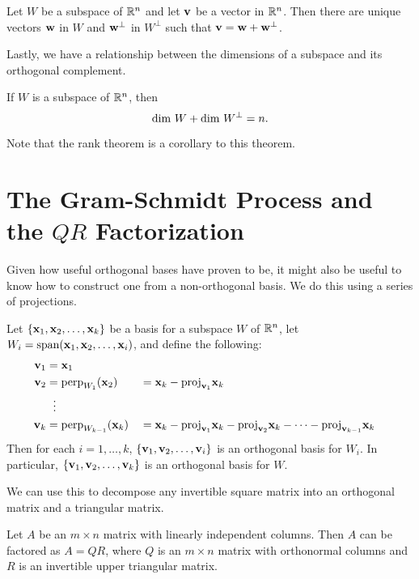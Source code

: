 \documentclass[../m073main.tex]{subfiles}
\begin{document}
\begin{theorem}
	Let $W$ be a subspace of $\mathbb{R}^n$ and let $\mathbf{v}$ be a vector in $\mathbb{R}^n$.
	Then there are unique vectors $\mathbf{w}$ in $W$ and $\mathbf{w}^\perp$ in $W^\perp$ such that $\mathbf{v} = \mathbf{w} + \mathbf{w}^\perp$.
\end{theorem}

\pagebreak

Lastly, we have a relationship between the dimensions of a subspace and its orthogonal complement.

\begin{theorem}
	If $W$ is a subspace of $\mathbb{R}^n$, then
	\[ \textrm{dim } W + \textrm{dim } W^\perp = n. \]
\end{theorem}

Note that the rank theorem is a corollary to this theorem.

\section{The Gram-Schmidt Process and the $QR$ Factorization}
Given how useful orthogonal bases have proven to be, it might also be useful to know how to construct one from a non-orthogonal basis.
We do this using a series of projections.

\begin{theorem}
	Let $\{\mathbf{x}_1, \mathbf{x}_2, \ldots, \mathbf{x}_k\}$ be a basis for a subspace $W$ of $\mathbb{R}^n$, let $W_i = \textrm{span}(\mathbf{x}_1, \mathbf{x}_2, \ldots, \mathbf{x}_i)$, and define the following:
	\begin{alignat*}{2}
		\mathbf{v}_1 &= \mathbf{x}_1 \\
		\mathbf{v}_2 &= \textrm{perp}_{W_1}(\mathbf{x}_2) &&= \mathbf{x}_k - \textrm{proj}_{\mathbf{v}_1}\mathbf{x}_k \\
		&\phantom{~!}\vdots \\
		\mathbf{v}_k &= \textrm{perp}_{W_{k-1}}(\mathbf{x}_k) &&= \mathbf{x}_k - \textrm{proj}_{\mathbf{v}_1}\mathbf{x}_k - \textrm{proj}_{\mathbf{v}_2}\mathbf{x}_k - \cdots - \textrm{proj}_{\mathbf{v}_{k-1}}\mathbf{x}_k
	\end{alignat*}
	Then for each $i = 1, \ldots, k$, $\{\mathbf{v}_1, \mathbf{v}_2, \ldots, \mathbf{v}_i\}$ is an orthogonal basis for $W_i$.
	In particular, $\{\mathbf{v}_1, \mathbf{v}_2, \ldots, \mathbf{v}_k\}$ is an orthogonal basis for $W$.
\end{theorem}

We can use this to decompose any invertible square matrix into an orthogonal matrix and a triangular matrix.

\begin{theorem}[$QR$ factorization]
	Let $A$ be an $m \times n$ matrix with linearly independent columns.
	Then $A$ can be factored as $A = QR$, where $Q$ is an $m \times n$ matrix with orthonormal columns and $R$ is an invertible upper triangular matrix.
\end{theorem}
\end{document}

